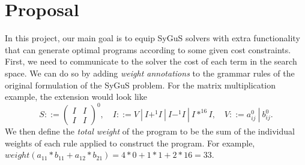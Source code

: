 \section{Proposal}
\label{sec:proposal}
%
In this project, our main goal is to equip SyGuS solvers with extra functionality that can generate optimal programs according to some given cost constraints.
%
First, we need to communicate to the solver the cost of each term in the search space.
%
We can do so by adding \emph{weight annotations} to the grammar rules of the original formulation of the SyGuS problem.
%
For the matrix multiplication example, the extension would look like
%
\[
    S ::=
    \begin{pmatrix} I & I \\
        I & I
    \end{pmatrix}^0, \quad
    I ::= V \ | \ I +^1 I \ | \ I -^1 I \ | \ I *^{16} I, \quad
V ::= a_{ij}^0 \ | \ b_{ij}^0.
\]
%
We then define the \emph{total weight} of the program to be the sum of the individual weights of each rule applied to construct the program. For example, $weight(a_{11} * b_{11} + a_{12} * b_{21}) = 4*0 + 1*1 + 2* 16 = 33$.
%

